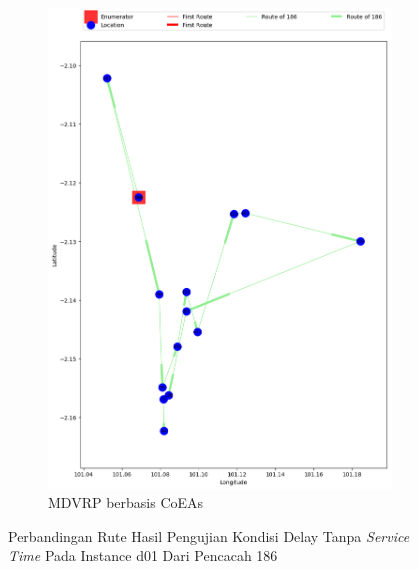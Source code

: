 \begin{figure}[H]
	\centering
	\begin{subfigure}[t]{\textwidth}
		\centering
		\includegraphics[width=\textwidth]{Resources/Images/delayed_1/real_m15_n100_delayed_1_186_coes}
		\caption{MDVRP berbasis CoEAs}
		\label{fig:real_m15_n100_delayed_1_186_coes}
	\end{subfigure}
	\caption{Perbandingan Rute Hasil Pengujian Kondisi Delay Tanpa \textit{Service Time} Pada Instance d01 Dari Pencacah 186}
	\label{fig:real_m15_n100_delayed_1_186}
\end{figure}


